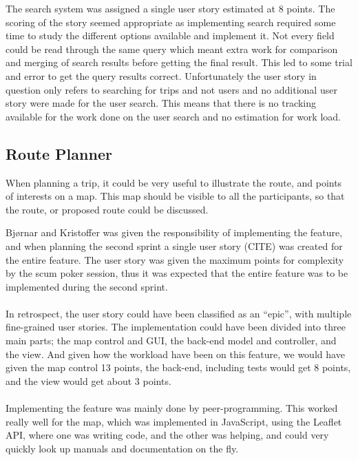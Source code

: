 \documentclass[a4paper]{article}
\begin{document}
The search system was assigned a single user story estimated at 8 points. The scoring of the story seemed appropriate as implementing search required some time to study the different options available and implement it. Not every field could be read through the same query which meant extra work for comparison and merging of search results before getting the final result. This led to some trial and error to get the query results correct. Unfortunately the user story in question only refers to searching for trips and not users and no additional user story were made for the user search. This means that there is no tracking available for the work done on the user search and no estimation for work load.
\subsection{Route Planner}

When planning a trip, it could be very useful to illustrate the route, and points of interests on a map. This map should be visible to all the participants, so that the route, or proposed route could be discussed.

Bjørnar and Kristoffer was given the responsibility of implementing the feature, and when planning the second sprint a single user story (CITE) was created for the entire feature. The user story was given the maximum points for complexity by the scum poker session, thus it was expected that the entire feature was to be implemented during the second sprint.

\paragraph{} In retrospect, the user story could have been classified as an “epic”, with multiple fine-grained user stories. The implementation could have been divided into three main parts; the map control and GUI, the back-end model and controller, and the view. And given how the workload have been on this feature, we would have given the map control 13 points, the back-end, including tests would get 8 points, and the view would get about 3 points.

\paragraph{}Implementing the feature was mainly done by peer-programming. This worked really well for the map, which was implemented in JavaScript, using the Leaflet API, where one was writing code, and the other was helping, and could very quickly look up manuals and documentation on the fly.
\end{document}
